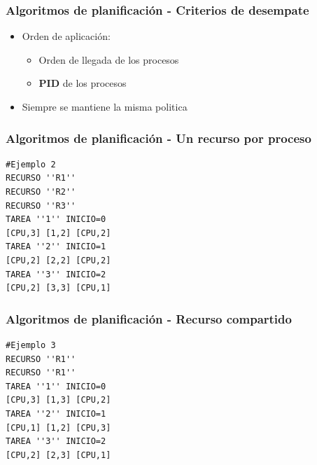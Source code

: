 \begin{frame}
  \frametitle{Algoritmos de planificación - Criterios de desempate}
  \begin{itemize}
  		\item Orden de aplicación:
  		\begin{itemize}
  			\item Orden de llegada de los procesos
  			\item \textbf{PID} de los procesos
  		\end{itemize}

		\item Siempre se mantiene la misma politica
  \end{itemize}
\end{frame}

\begin{frame}[fragile]
  \frametitle{Algoritmos de planificación - Un recurso por proceso}
  \begin{table}
      \centering
  \end{table}
  \begin{lstlisting}
#Ejemplo 2
RECURSO ''R1''
RECURSO ''R2''
RECURSO ''R3''
TAREA ''1'' INICIO=0
[CPU,3] [1,2] [CPU,2]
TAREA ''2'' INICIO=1
[CPU,2] [2,2] [CPU,2]
TAREA ''3'' INICIO=2
[CPU,2] [3,3] [CPU,1]
  \end{lstlisting}
\end{frame}

\begin{frame}[fragile]
  \frametitle{Algoritmos de planificación - Recurso compartido}
  \begin{table}
      \centering
  \end{table}
  \begin{lstlisting}
#Ejemplo 3
RECURSO ''R1''
RECURSO ''R1''
TAREA ''1'' INICIO=0
[CPU,3] [1,3] [CPU,2]
TAREA ''2'' INICIO=1
[CPU,1] [1,2] [CPU,3]
TAREA ''3'' INICIO=2
[CPU,2] [2,3] [CPU,1]
  \end{lstlisting}
\end{frame}

